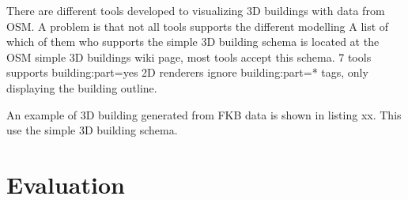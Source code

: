 There are different tools developed to visualizing 3D buildings with data from OSM. A problem is that not all tools supports the different modelling A list of which of them who supports the simple 3D building schema is located at the OSM simple 3D buildings wiki page, most tools accept this schema. 7 tools supports building:part=yes %
2D renderers ignore building:part=* tags, only displaying the building outline. 

An example of 3D building generated from FKB data is shown in listing xx. This use the simple 3D building schema. 

\section{Evaluation}

